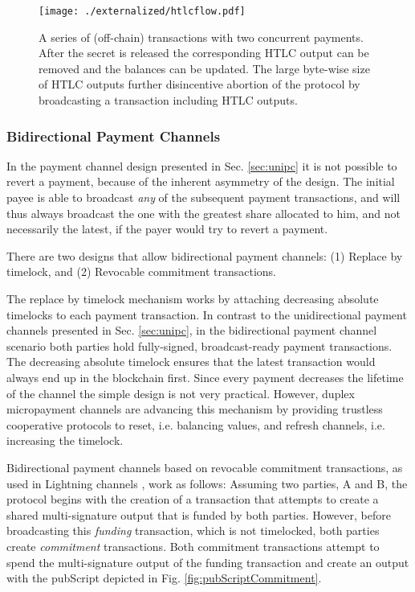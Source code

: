\begin{figure}
\centering
\texttt{[image: ./externalized/htlcflow.pdf]}
\caption{A series of (off-chain) transactions with two concurrent payments. After the secret is released the corresponding HTLC output can be removed and the balances can be updated. The large byte-wise size of HTLC outputs further disincentive abortion of the protocol by broadcasting a transaction including HTLC outputs.}
\label{fig:htlcflow}
\end{figure}

\subsubsection{Bidirectional Payment Channels}

In the payment channel design presented in Sec. \ref{sec:unipc} it is not possible to revert a payment, because of the inherent asymmetry of the design. The initial payee is able to broadcast \emph{any} of the subsequent payment transactions, and will thus always broadcast the one with the greatest share allocated to him, and not necessarily the latest, if the payer would try to revert a payment. 

There are two designs that allow bidirectional payment channels: (1) Replace by timelock, and (2) Revocable commitment transactions.

The replace by timelock mechanism works by attaching decreasing absolute timelocks to each payment transaction. In contrast to the unidirectional payment channels presented in Sec. \ref{sec:unipc}, in the bidirectional payment channel scenario both parties hold fully-signed, broadcast-ready payment transactions. The decreasing absolute timelock ensures that the latest transaction would always end up in the blockchain first. Since every payment decreases the lifetime of the channel the simple design is not very practical. However, duplex micropayment channels \parencite{decker2015Duplex} are advancing this mechanism by providing trustless cooperative protocols to reset, i.e. balancing values, and refresh channels, i.e. increasing the timelock. 

Bidirectional payment channels based on revocable commitment transactions, as used in Lightning channels \parencite{poonbitcoin},  work as follows:
Assuming two parties, A and B, the protocol begins with the creation of a transaction that attempts to create a shared multi-signature output that is funded by both parties. However, before broadcasting this \emph{funding} transaction, which is not timelocked, both parties create \emph{commitment} transactions. Both commitment transactions attempt to spend the multi-signature output of the funding transaction and create an output with the pubScript depicted in Fig. \ref{fig:pubScriptCommitment}.

